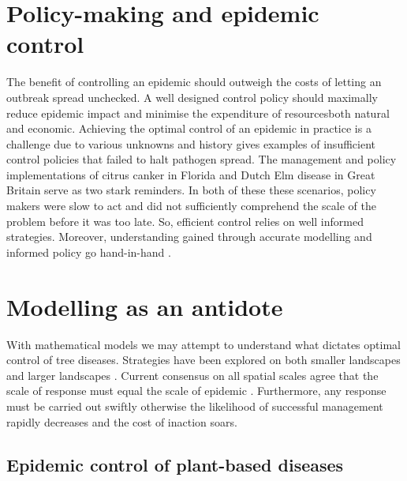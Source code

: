 \section{Policy-making and epidemic control}



The benefit of controlling an epidemic should outweigh the costs of letting an outbreak spread unchecked. A well designed control policy should maximally reduce epidemic impact and minimise the expenditure of resources\textemdash both natural and economic. Achieving the optimal control of an epidemic in practice is a challenge due to various unknowns \cite{13-challenges} and history gives examples of insufficient control policies that failed to halt pathogen spread. The management and policy implementations of citrus canker in Florida \cite{schubert2001meeting} and Dutch Elm disease in Great Britain \cite{dutch-elm-mismanage} serve as two stark reminders. In both of these these scenarios, policy makers were slow to act and did not sufficiently comprehend the scale of the problem before it was too late. So, efficient control relies on well informed strategies. Moreover, understanding gained through accurate modelling and informed policy go hand-in-hand \cite{jones2020modelling}.\\

\section{Modelling as an antidote}
With mathematical models we may attempt to understand what dictates optimal control of tree diseases. Strategies have been explored on both smaller landscapes \cite{WEBIDEMICS, risk-potential-control} and larger landscapes \cite{large-scale-control, large-scale-control2}. Current consensus on all spatial scales agree that the scale of response must equal the scale of epidemic \cite{control-scale-matching}. Furthermore, any response must be carried out swiftly otherwise the likelihood of successful management rapidly decreases and the cost of inaction soars.

\subsection{Epidemic control of plant-based diseases}

